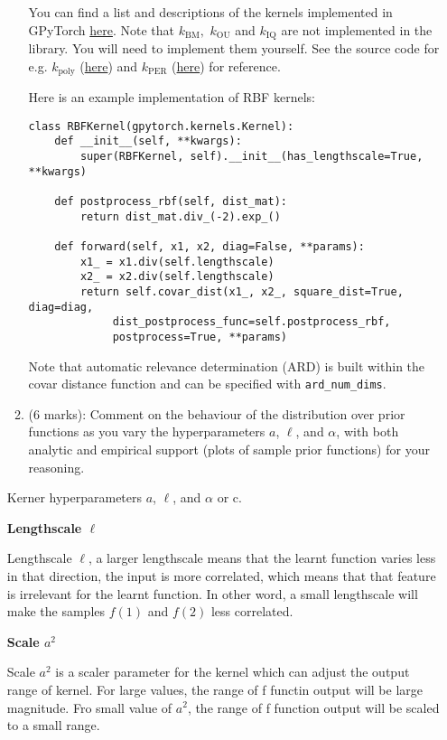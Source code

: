 \documentclass[11pt]{article}
\begin{document}
\begin{enumerate}
\begin{enumerate}[label=(\alph*)]
You can find a list and descriptions of the kernels implemented in GPyTorch
\href{https://gpytorch.readthedocs.io/en/latest/kernels.html}{here}. Note that 
$k_{\text{BM}},$ $k_{\text{OU}}$ and $k_{\text{IQ}}$ are not implemented in the library. You will need to implement
them yourself. See the source code for e.g. $k_{\text{poly}}$ 
(\href{https://github.com/cornellius-gp/gpytorch/blob/master/gpytorch/kernels/polynomial_kernel.py}{here})
and $k_{\text{PER}}$ 
(\href{https://github.com/cornellius-gp/gpytorch/blob/master/gpytorch/kernels/periodic_kernel.py}{here})
for reference.

Here is an example implementation of RBF kernels:
\begin{lstlisting}
class RBFKernel(gpytorch.kernels.Kernel):
    def __init__(self, **kwargs):
        super(RBFKernel, self).__init__(has_lengthscale=True, **kwargs)

    def postprocess_rbf(self, dist_mat):
        return dist_mat.div_(-2).exp_()

	def forward(self, x1, x2, diag=False, **params):
		x1_ = x1.div(self.lengthscale)
		x2_ = x2.div(self.lengthscale)
		return self.covar_dist(x1_, x2_, square_dist=True, diag=diag,
		     dist_postprocess_func=self.postprocess_rbf,
	         postprocess=True, **params)
\end{lstlisting}

Note that automatic relevance determination (ARD) is built within the covar distance function and can be specified with \texttt{ard\_num\_dims}.

\item (6 marks): Comment on the behaviour of the distribution over prior functions as you vary the hyperparameters $a$, $\ell$, and $\alpha$, with both analytic and empirical support (plots of sample prior functions) for your reasoning.
\end{enumerate}

Kerner hyperparameters $a$, $\ell$, and $\alpha$ or c.

\textbf{Lengthscale $\ell$}

Lengthscale $\ell$, a larger lengthscale means that the learnt function varies less in that direction, the input is more correlated, which means that that feature is irrelevant for the learnt function. In other word, a small lengthscale will make the samples $f(1)$ and $f(2)$ less correlated.

\textbf{Scale $a^2$}

Scale $a^2$ is a scaler parameter for the kernel which can adjust the output range of kernel. For large values, the range of f functin output will be large magnitude.
Fro small value of $a^2$, the range of f function output will be scaled to a small range.


\end{enumerate}
\end{document}
